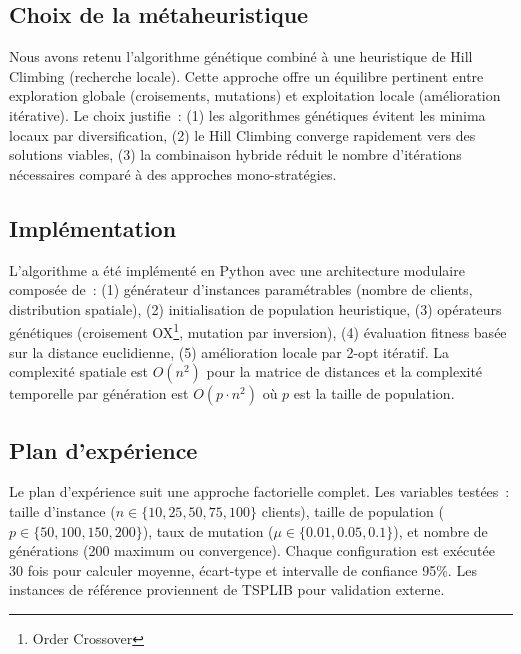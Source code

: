 \subsection*{Choix de la métaheuristique}
{}

\noindent Nous avons retenu l'algorithme génétique combiné à une heuristique de Hill Climbing (recherche locale). Cette approche offre un équilibre pertinent entre exploration globale (croisements, mutations) et exploitation locale (amélioration itérative). Le choix justifie~: (1) les algorithmes génétiques évitent les minima locaux par diversification, (2) le Hill Climbing converge rapidement vers des solutions viables, (3) la combinaison hybride réduit le nombre d'itérations nécessaires comparé à des approches mono-stratégies.

\subsection*{Implémentation}
{}

\noindent L'algorithme a été implémenté en Python avec une architecture modulaire composée de~: (1) générateur d'instances paramétrables (nombre de clients, distribution spatiale), (2) initialisation de population heuristique, (3) opérateurs génétiques (croisement OX\footnote{Order Crossover}, mutation par inversion), (4) évaluation fitness basée sur la distance euclidienne, (5) amélioration locale par 2-opt itératif. La complexité spatiale est $O(n^2)$ pour la matrice de distances et la complexité temporelle par génération est $O(p \cdot n^2)$ où $p$ est la taille de population.

\subsection*{Plan d'expérience}
{}

\noindent Le plan d'expérience suit une approche factorielle complet. Les variables testées~: taille d'instance ($n \in \{10, 25, 50, 75, 100\}$ clients), taille de population ($p \in \{50, 100, 150, 200\}$), taux de mutation ($\mu \in \{0.01, 0.05, 0.1\}$), et nombre de générations (200 maximum ou convergence). Chaque configuration est exécutée 30 fois pour calculer moyenne, écart-type et intervalle de confiance 95\%. Les instances de référence proviennent de TSPLIB pour validation externe.

